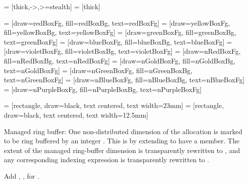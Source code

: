 

 = [thick,->,>=stealth]
 = [thick]

 = [draw=redBoxFg, fill=redBoxBg, text=redBoxFg]
 = [draw=yellowBoxFg, fill=yellowBoxBg, text=yellowBoxFg]
 = [draw=greenBoxFg, fill=greenBoxBg, text=greenBoxFg]
 = [draw=blueBoxFg, fill=blueBoxBg, text=blueBoxFg]
 = [draw=violetBoxFg, fill=violetBoxBg, text=violetBoxFg]
 = [draw=nRedBoxFg, fill=nRedBoxBg, text=nRedBoxFg]
 = [draw=nGoldBoxFg, fill=nGoldBoxBg, text=nGoldBoxFg]
 = [draw=nGreenBoxFg, fill=nGreenBoxBg, text=nGreenBoxFg]
 = [draw=nBlueBoxFg, fill=nBlueBoxBg, text=nBlueBoxFg]
 = [draw=nPurpleBoxFg, fill=nPurpleBoxBg, text=nPurpleBoxFg]

 = [rectangle, draw=black, text centered, text width=23mm]
 = [rectangle, draw=black, text centered, text width=12.5mm]

\newcommand{\qc}[1]{\left\llbracket#1\right\rrbracket}





Managed ring buffer: One non-distributed dimension of the allocation is marked to be ring buffered by an integer .
This is by extending  to have a  member.
The extent of the managed ring-buffer dimension is transparently rewritten to , and any corresponding indexing expression  is transparently rewritten to .



Add , ,  for .



